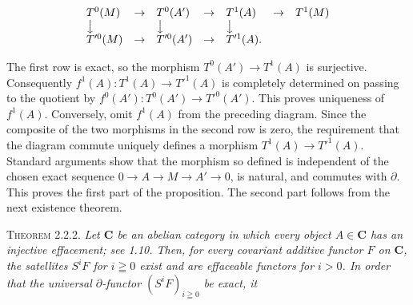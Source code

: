 \[
\begin{array}{lclclcl}
T^0(M)&\to&T^0(A')&\to&T^1(A)&\to&T^1(M)\\
\big\downarrow&&\big\downarrow&&\big\downarrow&&\\
T'^0(M)&\to&T'^0(A')&\to&T'^1(A).&&
\end{array}
\]

\noindent The first row is exact, so the morphism
$T^0(A')\to T^1(A)$ is surjective. Consequently
$f^1(A):T^1(A)\to T'^1(A)$ is completely determined on passing
to the quotient by
$f^0(A'):T^0(A')\to T'^0(A')$. This proves uniqueness of
$f^1(A)$. Conversely, omit $f^1(A)$ from the preceding diagram. Since the
composite of the two morphisms in the second row is zero, the requirement
that the diagram commute uniquely defines a morphism
$T^1(A)\to T'^1(A)$. Standard arguments show that the morphism so
defined is independent of the chosen exact sequence
$0\to A\to M\to A'\to 0$,
is natural, and commutes with $\partial$. This proves the first part of the
proposition. The second part follows from the next existence theorem.

\indent\textsc{Theorem 2.2.2.} \textit{Let $\mathbf{C}$ be an abelian category in
which every object $A\in \mathbf{C}$ has an injective effacement; see 1.10. Then, for
every covariant additive functor $F$ on $\mathbf{C}$, the satellites $S^iF$ for
$i\geqq0$ exist and are effaceable functors for $i>0$. In order that the
universal $\partial$-functor $(S^iF)_{i\geqq0}$ be exact, it}

